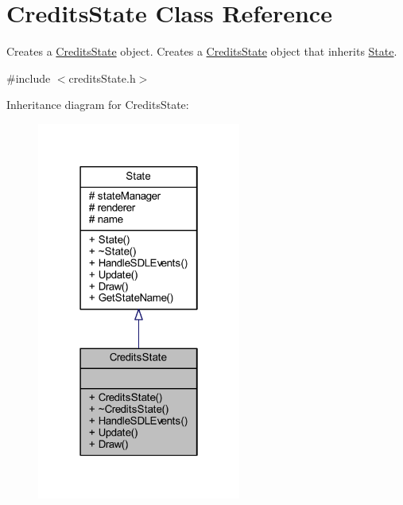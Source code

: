 \hypertarget{class_credits_state}{\section{Credits\+State Class Reference}
\label{class_credits_state}
}


Creates a \hyperlink{class_credits_state}{Credits\+State} object. Creates a \hyperlink{class_credits_state}{Credits\+State} object that inherits \hyperlink{class_state}{State}.  




{\ttfamily \#include $<$credits\+State.\+h$>$}



Inheritance diagram for Credits\+State\+:
\nopagebreak
\begin{figure}[H]
\begin{center}
\leavevmode
\includegraphics[width=190pt]{class_credits_state__inherit__graph}
\end{center}
\end{figure}


